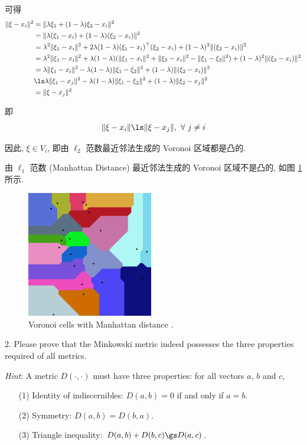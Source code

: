 \documentclass[openany]{ctexbook}
\theoremstyle{kaiti}
\theoremstyle{normal}
\begin{document}
可得
\begin{equation}
  \begin{aligned}
    \|\xi-x_i\|^2
    &=\|\lambda\xi_1+(1-\lambda)\xi_2-x_i\|^2\\
    &=\|\lambda(\xi_1-x_i)+(1-\lambda)(\xi_2-x_i)\|^2\\
    &=\lambda^2\|\xi_1-x_i\|^2+2\lambda(1-\lambda)(\xi_1-x_i)^\top(\xi_2-x_i)+(1-\lambda)^2\|(\xi_2-x_i)\|^2\\
    &=\lambda^2\|\xi_1-x_i\|^2+\lambda(1-\lambda)(\|\xi_1-x_i\|^2+\|\xi_2-x_i\|^2-\|\xi_1-\xi_2\|^2)+(1-\lambda)^2\|(\xi_2-x_i)\|^2\\
    &=\lambda\|\xi_1-x_i\|^2-\lambda(1-\lambda)\|\xi_1-\xi_2\|^2+(1-\lambda)\|(\xi_2-x_i)\|^2\\
    &\ls\lambda\|\xi_1-x_j\|^2-\lambda(1-\lambda)\|\xi_1-\xi_2\|^2+(1-\lambda)\|\xi_2-x_j\|^2\\
    &=\|\xi-x_j\|^2
  \end{aligned}
\end{equation}

即
\begin{equation}
  \|\xi-x_i\|\ls\|\xi-x_j\|,~\forall~j\neq i
\end{equation}

因此, $\xi\in V_i$, 即由 $\ell_2$ 范数最近邻法生成的 Voronoi 区域都是凸的. 

由 $\ell_1$ 范数 (Manhattan Distance) 最近邻法生成的 Voronoi 区域不是凸的, 如图 \ref{fig:l1} 所示.

\begin{figure}[ht]
	\centering
	\includegraphics[width=5.5cm]{Manhattan_Voronoi_Diagram.png}
	\caption{Voronoi cells with Manhattan distance \cite{ManhattanVoronoi}.}
	\label{fig:l1}
\end{figure}

2. Please prove that the Minkowski metric indeed possesses the three properties required of all metrics.

\emph{Hint}: A metric $D(\cdot,\cdot)$ must have three properties: for all vectors $a$, $b$ and $c$,
\begin{enumerate}
  \item[(1)] Identity of indiscernibles: $D(a, b) = 0$ if and only if $a = b$.
  \item[(2)] Symmetry: $D(a, b) = D(b, a)$.
  \item[(3)] Triangle inequality: $D(a, b) + D(b, c) \gs D(a, c)$.
\end{enumerate}
\end{document}
